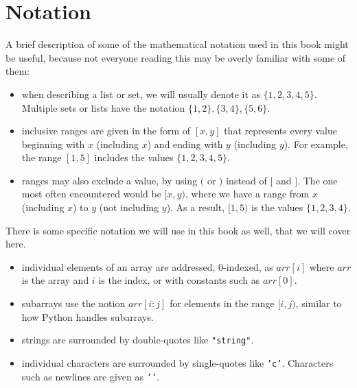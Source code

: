 \section*{Notation}

A brief description of some of the mathematical notation used in this book might be useful, because not everyone reading this may be overly familiar with some of them:
\begin{itemize}
\item when describing a list or set, we will usually denote it as $\{1,2,3,4,5\}$. Multiple sets or lists have the notation $\{1,2\},\{3,4\},\{5,6\}$.
\item inclusive ranges are given in the form of $[x,y]$ that represents every value beginning with $x$ (including $x$) and ending with $y$ (including $y$). For example, the range $[1,5]$ includes the values $\{1,2,3,4,5\}$.
\item ranges may also exclude a value, by using $($ or $)$ instead of $[$ and $]$. The one most often encountered would be $[x,y)$, where we have a range from $x$ (including $x$) to $y$ (not including $y$). As a result, $[1,5)$ is the values $\{1,2,3,4\}$.
\end{itemize}

There is some specific notation we will use in this book as well, that we will cover here.
\begin{itemize}
\item individual elements of an array are addressed, 0-indexed, as $arr[i]$ where $arr$ is the array and $i$ is the index, or with constants such as $arr[0]$.
\item subarrays use the notion $arr[i:j]$ for elements in the range $[i,j)$, similar to how Python handles subarrays.
\item strings are surrounded by double-quotes like \texttt{"string"}.
\item individual characters are surrounded by single-quotes like \texttt{'c'}. Characters such as newlines are given as \texttt{'\n'}.
\end{itemize}
